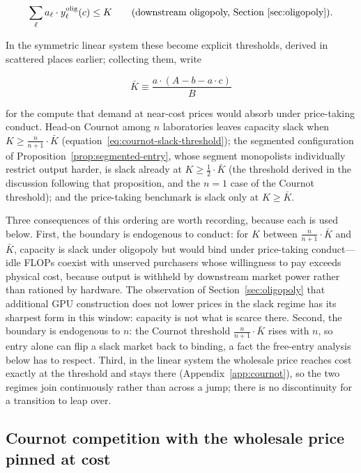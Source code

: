 \documentclass[11pt]{article}
\begin{document}
\begin{equation}\sum_\ell a_\ell\cdot y_\ell^{\mathrm{olig}}(c)\leq K\qquad\text{(downstream oligopoly, Section~\ref{sec:oligopoly})}.\end{equation}

In the symmetric linear system these become explicit thresholds, derived in scattered places earlier; collecting them, write

\begin{equation}\bar K\equiv\frac{a\cdot(A-b-a\cdot c)}{B}\end{equation}

for the compute that demand at near-cost prices would absorb under price-taking conduct. Head-on Cournot among $n$ laboratories leaves capacity slack when $K\geq\frac{n}{n+1}\cdot\bar K$ (equation~\eqref{eq:cournot-slack-threshold}); the segmented configuration of Proposition~\ref{prop:segmented-entry}, whose segment monopolists individually restrict output harder, is slack already at $K\geq\frac{1}{2}\cdot\bar K$ (the threshold derived in the discussion following that proposition, and the $n=1$ case of the Cournot threshold); and the price-taking benchmark is slack only at $K\geq\bar K$.

Three consequences of this ordering are worth recording, because each is used below. First, the boundary is endogenous to conduct: for $K$ between $\frac{n}{n+1}\cdot\bar K$ and $\bar K$, capacity is slack under oligopoly but would bind under price-taking conduct---idle FLOPs coexist with unserved purchasers whose willingness to pay exceeds physical cost, because output is withheld by downstream market power rather than rationed by hardware. The observation of Section~\ref{sec:oligopoly} that additional GPU construction does not lower prices in the slack regime has its sharpest form in this window: capacity is not what is scarce there. Second, the boundary is endogenous to $n$: the Cournot threshold $\frac{n}{n+1}\cdot\bar K$ rises with $n$, so entry alone can flip a slack market back to binding, a fact the free-entry analysis below has to respect. Third, in the linear system the wholesale price reaches cost exactly at the threshold and stays there (Appendix~\ref{app:cournot}), so the two regimes join continuously rather than across a jump; there is no discontinuity for a transition to leap over.

\subsection{Cournot competition with the wholesale price pinned at cost}
\label{subsec:slack-cournot}
\end{document}
